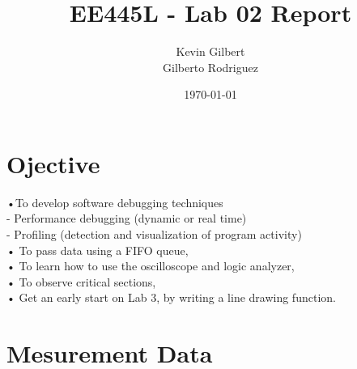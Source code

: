 \documentclass[11pt]{article}
\title{EE445L - Lab 02 Report}
\author{Kevin Gilbert\\ Gilberto Rodriguez}
\date{\today}
\begin{document}
\maketitle{}

\section*{Ojective}
•To develop software debugging techniques\\
\indent- Performance debugging (dynamic or real time)\\
\indent- Profiling (detection and visualization of program activity)\\
• To pass data using a FIFO queue,\\
• To learn how to use the oscilloscope and logic analyzer,\\
• To observe critical sections,\\
• Get an early start on Lab 3, by writing a line drawing function.\\

\section*{Mesurement Data}
\end{document}
